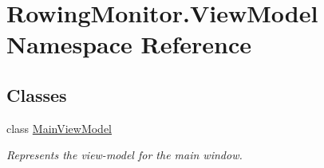 \hypertarget{namespace_rowing_monitor_1_1_view_model}{}\section{Rowing\+Monitor.\+View\+Model Namespace Reference}
\label{namespace_rowing_monitor_1_1_view_model}
\subsection*{Classes}
\begin{DoxyCompactItemize}
\item 
class \hyperlink{class_rowing_monitor_1_1_view_model_1_1_main_view_model}{Main\+View\+Model}
\begin{DoxyCompactList}\small\item\em Represents the view-\/model for the main window. \end{DoxyCompactList}\end{DoxyCompactItemize}
